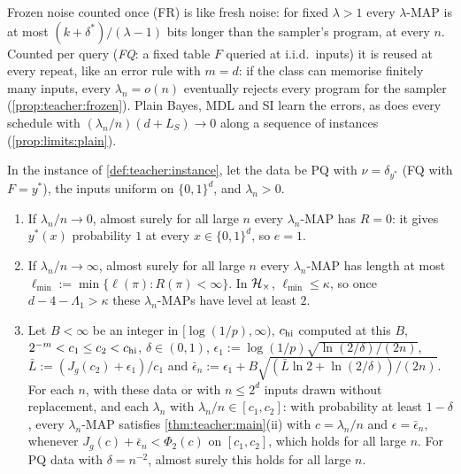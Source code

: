 Frozen noise counted once (FR) is like fresh noise: for fixed $\lambda>1$ every $\lambda$-MAP is at most $(k+\delta^*)/(\lambda-1)$ bits longer than the sampler's program, at every $n$. Counted per query (\emph{FQ}: a fixed table $F$ queried at i.i.d.\ inputs) it is reused at every repeat, like an error rule with $m=d$: if the class can memorise finitely many inputs, every $\lambda_n=o(n)$ eventually rejects every program for the sampler (\cref{prop:teacher:frozen}). Plain Bayes, MDL and SI learn the errors, as does every schedule with $(\lambda_n/n)(d+L_S)\to0$ along a sequence of instances (\cref{prop:limits:plain}).

\begin{proposition}\label{prop:teacher:schedules}
In the instance of \cref{def:teacher:instance}, let the data be PQ with $\nu=\delta_{y^*}$ (FQ with $F=y^*$), the inputs uniform on $\{0,1\}^d$, and $\lambda_n>0$.
\begin{enumerate}[label=(\alph*),itemsep=0pt,topsep=2pt]
\item If $\lambda_n/n\to0$, almost surely for all large $n$ every $\lambda_n$-MAP has $R=0$: it gives $y^*(x)$ probability $1$ at every $x\in\{0,1\}^d$, so $e=1$.
\item If $\lambda_n/n\to\infty$, almost surely for all large $n$ every $\lambda_n$-MAP has length at most $\ell_{\min}:=\min\{\ell(\pi):R(\pi)<\infty\}$. In $\mathcal{H}_{\times}$, $\ell_{\min}\le\kappa$, so once $d-4-\Lambda_1>\kappa$ these $\lambda_n$-MAPs have level at least $2$.
\item Let $B<\infty$ be an integer in $[\log(1/p),\infty)$, $c_{\rm hi}$ computed at this $B$, $2^{-m}<c_1\le c_2<c_{\rm hi}$, $\delta\in(0,1)$, $\epsilon_1:=\log(1/p)\sqrt{\ln(2/\delta)/(2n)}$, $\bar L:=(J_g(c_2)+\epsilon_1)/c_1$ and $\bar\epsilon_n:=\epsilon_1+B\sqrt{(\bar L\ln2+\ln(2/\delta))/(2n)}$. For each $n$, with these data or with $n\le2^d$ inputs drawn without replacement, and each $\lambda_n$ with $\lambda_n/n\in[c_1,c_2]$: with probability at least $1-\delta$, every $\lambda_n$-MAP satisfies \cref{thm:teacher:main}(ii) with $c=\lambda_n/n$ and $\epsilon=\bar\epsilon_n$, whenever $J_g(c)+\bar\epsilon_n<\Phi_2(c)$ on $[c_1,c_2]$, which holds for all large $n$. For PQ data with $\delta=n^{-2}$, almost surely this holds for all large $n$.
\end{enumerate}
\end{proposition}

